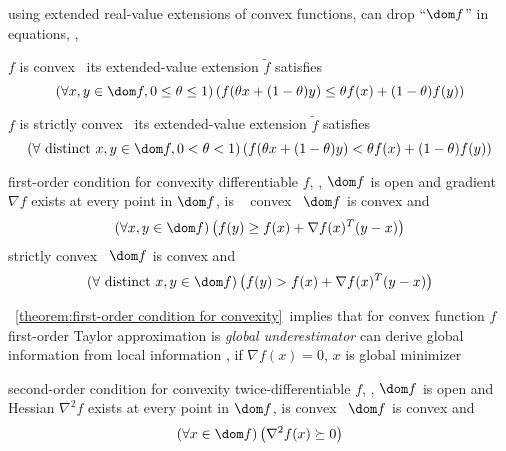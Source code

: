 \documentclass[17pt,landscape]{foils}
\begin{document}
{\bit
\item
	using extended real-value extensions of convex functions,
	can drop ``$\dom f$'' in equations,
	\eg,
	\bit
	\item
		$f$ is convex \iaoi\ its extended-value extension $\tilde{f}$ satisfies
		$$
			\left(
				\forall x,y\in \dom f, 0\leq \theta \leq 1
			\right)
			\left(
				f(\theta x + (1-\theta) y)
				\leq
				\theta f(x) + (1-\theta) f(y)
			\right)
		$$
	\item
		$f$ is strictly convex \iaoi\ its extended-value extension $\tilde{f}$ satisfies
		$$
			\left(
				\forall \mbox{ distinct } x,y\in \dom f, 0< \theta < 1
			\right)
			\left(
				f(\theta x + (1-\theta) y)
				<
				\theta f(x) + (1-\theta) f(y)
			\right)
		$$
	\eit
\eit



\begin{mytheorem}{first-order condition for convexity}
	differentiable $f$,
	\ie, $\dom f$ is open
	and gradient $\nabla f$ exists at every point in $\dom f$,
	is
	\shrinkspacewithintheoremslike\
	\ibit
	\iitem
		convex \iaoi\ $\dom f$ is convex
		and
		$$
			\left(
				\forall x,y\in \dom f
			\right)
			\left(
				f(y) \geq f(x) + \nabla f(x) ^T (y-x)
			\right)
		$$
	\iitem
		strictly convex \iaoi\ $\dom f$ is convex
		and
		$$
			\left(
				\forall \mbox{ distinct } x,y\in \dom f
			\right)
			\left(
				f(y) > f(x) + \nabla f(x) ^T (y-x)
			\right)
		$$
	\eit
\end{mytheorem}

\bit
\item
	\theoremname~\ref{theorem:first-order condition for convexity}\
	implies
	that
	for convex function $f$
	\bit
	\vitem
		first-order Taylor approximation is \emph{global underestimator}
	\vitem
		can derive
		global information
		from
		local information
		\bit
		\iitem
			\eg, if $\nabla f(x)=0$, $x$ is global minimizer
		\iitem
		\eit
	\eit
\eit



\begin{mytheorem}{second-order condition for convexity}
	twice-differentiable $f$,
	\ie, $\dom f$ is open
	and Hessian $\nabla^2 f$ exists at every point in $\dom f$,
	is
	convex \iaoi\ $\dom f$ is convex
	and
	$$
		\left(
			\forall x\in \dom f
		\right)
		\left(
			\nabla^2 f(x) \succeq 0
		\right)
	$$


\end{mytheorem}}
\end{document}
